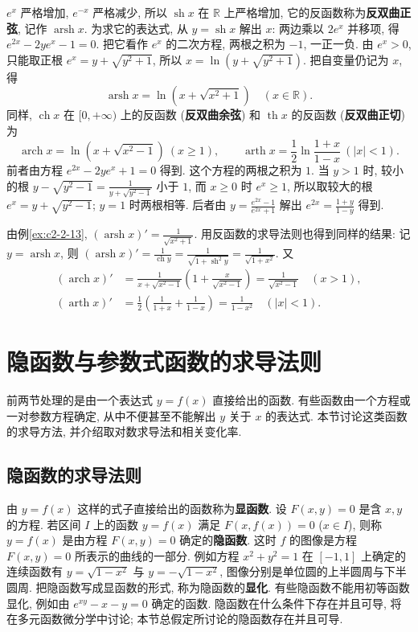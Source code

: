 \documentclass[UTF8,openany]{ctexbook}
\theoremstyle{chinesetextbook}
\begin{document}
$e^x$ 严格增加, $e^{-x}$ 严格减少, 所以 $\operatorname{sh}x$ 在 $\mathbb R$ 上严格增加, 它的反函数称为\textbf{反双曲正弦}, 记作 $\operatorname{arsh}x$. 为求它的表达式, 从 $y=\operatorname{sh}x$ 解出 $x$: 两边乘以 $2e^x$ 并移项, 得 $e^{2x}-2ye^x-1=0$. 把它看作 $e^x$ 的二次方程, 两根之积为 $-1$, 一正一负. 由 $e^x>0$, 只能取正根 $e^x=y+\sqrt{y^2+1}$, 所以 $x=\ln\left(y+\sqrt{y^2+1}\right)$. 把自变量仍记为 $x$, 得
\[
\operatorname{arsh}x=\ln\left(x+\sqrt{x^2+1}\right)\quad(x\in\mathbb R).
\]
同样, $\operatorname{ch}x$ 在 $[0,+\infty)$ 上的反函数 (\textbf{反双曲余弦}) 和 $\operatorname{th}x$ 的反函数 (\textbf{反双曲正切}) 为
\[
\operatorname{arch}x=\ln\left(x+\sqrt{x^2-1}\right)\ (x\ge1),\qquad\operatorname{arth}x=\frac12\ln\frac{1+x}{1-x}\ (|x|<1).
\]
前者由方程 $e^{2x}-2ye^x+1=0$ 得到. 这个方程的两根之积为 $1$. 当 $y>1$ 时, 较小的根 $\displaystyle y-\sqrt{y^2-1}=\frac1{y+\sqrt{y^2-1}}$ 小于 $1$, 而 $x\ge0$ 时 $e^x\ge1$, 所以取较大的根 $e^x=y+\sqrt{y^2-1}$; $y=1$ 时两根相等. 后者由 $\displaystyle y=\frac{e^{2x}-1}{e^{2x}+1}$ 解出 $\displaystyle e^{2x}=\frac{1+y}{1-y}$ 得到.

由例\ref{ex:c2-2-13}, $\displaystyle(\operatorname{arsh}x)'=\frac1{\sqrt{x^2+1}}$. 用反函数的求导法则也得到同样的结果: 记 $y=\operatorname{arsh}x$, 则 $\displaystyle(\operatorname{arsh}x)'=\frac1{\operatorname{ch}y}=\frac1{\sqrt{1+\operatorname{sh}^2y}}=\frac1{\sqrt{1+x^2}}$. 又
\[
\begin{aligned}
(\operatorname{arch}x)'&=\frac1{x+\sqrt{x^2-1}}\left(1+\frac x{\sqrt{x^2-1}}\right)=\frac1{\sqrt{x^2-1}}\quad(x>1),\\
(\operatorname{arth}x)'&=\frac12\left(\frac1{1+x}+\frac1{1-x}\right)=\frac1{1-x^2}\quad(|x|<1).
\end{aligned}
\]
\section{隐函数与参数式函数的求导法则}
前两节处理的是由一个表达式 $y=f(x)$ 直接给出的函数. 有些函数由一个方程或一对参数方程确定, 从中不便甚至不能解出 $y$ 关于 $x$ 的表达式. 本节讨论这类函数的求导方法, 并介绍取对数求导法和相关变化率.
\subsection{隐函数的求导法则}
由 $y=f(x)$ 这样的式子直接给出的函数称为\textbf{显函数}. 设 $F(x,y)=0$ 是含 $x,y$ 的方程. 若区间 $I$ 上的函数 $y=f(x)$ 满足 $F(x,f(x))=0$ ($x\in I$), 则称 $y=f(x)$ 是由方程 $F(x,y)=0$ 确定的\textbf{隐函数}. 这时 $f$ 的图像是方程 $F(x,y)=0$ 所表示的曲线的一部分. 例如方程 $x^2+y^2=1$ 在 $[-1,1]$ 上确定的连续函数有 $y=\sqrt{1-x^2}$ 与 $y=-\sqrt{1-x^2}$, 图像分别是单位圆的上半圆周与下半圆周. 把隐函数写成显函数的形式, 称为隐函数的\textbf{显化}. 有些隐函数不能用初等函数显化, 例如由 $e^{xy}-x-y=0$ 确定的函数. 隐函数在什么条件下存在并且可导, 将在多元函数微分学中讨论; 本节总假定所讨论的隐函数存在并且可导.
\end{document}
